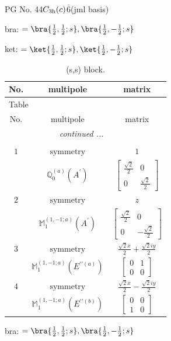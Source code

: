 \documentclass[fleqn,8pt,landscape]{jsarticle}
\begin{document}
\setcounter{MaxMatrixCols}{32}

\renewcommand{\tablename}{Table~}
\renewcommand{\figurename}{Figure~}
\begin{center}
\LARGE
PG No. 44\quad$C_{\rm 3h}(c)$\quad$\bar{6}$\quad[ hexagonal ] (jml basis)
\end{center}
bra: $=\bra{\frac{1}{2},\frac{1}{2};s}, \bra{\frac{1}{2},- \frac{1}{2};s}$

\noindent
ket: $=\ket{\frac{1}{2},\frac{1}{2};s}, \ket{\frac{1}{2},- \frac{1}{2};s}$
\renewcommand{\arraystretch}{1.6}
\begin{longtable}{ccc}
\caption{(s,s) block.}
 \\
 \hline \hline
No. & multipole & matrix \\ \hline \endfirsthead

\multicolumn{2}{l}{\tablename\ \thetable{}} \\
 \hline \hline
No. & multipole & matrix \\ \hline \endhead

 \hline \hline
\multicolumn{2}{r}{\footnotesize\it continued ...} \\ \endfoot

 \hline \hline
\multicolumn{2}{r}{} \\ \endlastfoot

$ 1 $ & $ \text{symmetry} $ & $ 1 $ \\
$  $ & $ \mathbb{Q}_{0}^{(a)}(A^{\prime}) $ & $ \begin{bmatrix} \frac{\sqrt{2}}{2} & 0 \\ 0 & \frac{\sqrt{2}}{2} \end{bmatrix} $ \\ \hline
$ 2 $ & $ \text{symmetry} $ & $ z $ \\
$  $ & $ \mathbb{M}_{1}^{(1,-1;a)}(A^{\prime}) $ & $ \begin{bmatrix} \frac{\sqrt{2}}{2} & 0 \\ 0 & - \frac{\sqrt{2}}{2} \end{bmatrix} $ \\ \hline
$ 3 $ & $ \text{symmetry} $ & $ \frac{\sqrt{2} x}{2} + \frac{\sqrt{2} i y}{2} $ \\
$  $ & $ \mathbb{M}_{1}^{(1,-1;a)}(E^{\prime\prime(a)}) $ & $ \begin{bmatrix} 0 & 1 \\ 0 & 0 \end{bmatrix} $ \\ \hline
$ 4 $ & $ \text{symmetry} $ & $ \frac{\sqrt{2} x}{2} - \frac{\sqrt{2} i y}{2} $ \\
$  $ & $ \mathbb{M}_{1}^{(1,-1;a)}(E^{\prime\prime(b)}) $ & $ \begin{bmatrix} 0 & 0 \\ 1 & 0 \end{bmatrix} $ \\ \hline
\end{longtable}
bra: $=\bra{\frac{1}{2},\frac{1}{2};s}, \bra{\frac{1}{2},- \frac{1}{2};s}$
\end{document}
